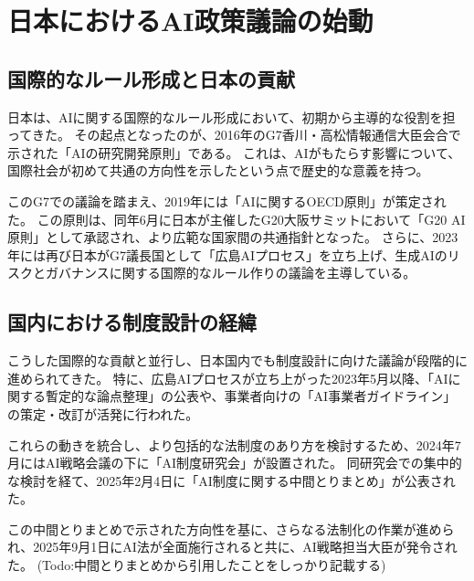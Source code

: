 \chapter{日本におけるAI政策議論の始動} %

\section{国際的なルール形成と日本の貢献}

日本は、AIに関する国際的なルール形成において、初期から主導的な役割を担ってきた。
その起点となったのが、2016年のG7香川・高松情報通信大臣会合で示された「AIの研究開発原則」である。
これは、AIがもたらす影響について、国際社会が初めて共通の方向性を示したという点で歴史的な意義を持つ。

このG7での議論を踏まえ、2019年には「AIに関するOECD原則」が策定された。
この原則は、同年6月に日本が主催したG20大阪サミットにおいて「G20 AI原則」として承認され、より広範な国家間の共通指針となった。
さらに、2023年には再び日本がG7議長国として「広島AIプロセス」を立ち上げ、生成AIのリスクとガバナンスに関する国際的なルール作りの議論を主導している。

\section{国内における制度設計の経緯}
こうした国際的な貢献と並行し、日本国内でも制度設計に向けた議論が段階的に進められてきた。
特に、広島AIプロセスが立ち上がった2023年5月以降、「AIに関する暫定的な論点整理」の公表や、事業者向けの「AI事業者ガイドライン」の策定・改訂が活発に行われた。

これらの動きを統合し、より包括的な法制度のあり方を検討するため、2024年7月にはAI戦略会議の下に「AI制度研究会」が設置された。
同研究会での集中的な検討を経て、2025年2月4日に「AI制度に関する中間とりまとめ」が公表された。

この中間とりまとめで示された方向性を基に、さらなる法制化の作業が進められ、2025年9月1日にAI法が全面施行されると共に、AI戦略担当大臣が発令された。
(Todo:中間とりまとめから引用したことをしっかり記載する)
